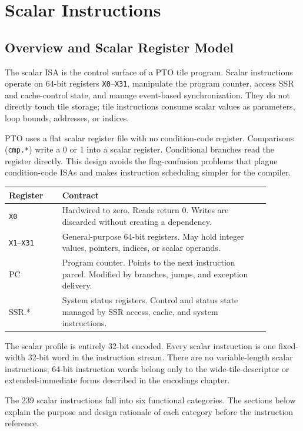 \chapter{Scalar Instructions}
\label{chap:scalar-instructions}

\section{Overview and Scalar Register Model}
The scalar ISA is the control surface of a PTO tile program. Scalar instructions operate on 64-bit registers \texttt{X0}--\texttt{X31}, manipulate the program counter, access SSR and cache-control state, and manage event-based synchronization. They do not directly touch tile storage; tile instructions consume scalar values as parameters, loop bounds, addresses, or indices.

PTO uses a flat scalar register file with no condition-code register. Comparisons (\texttt{cmp.*}) write a 0 or 1 into a scalar register. Conditional branches read the register directly. This design avoids the flag-confusion problems that plague condition-code ISAs and makes instruction scheduling simpler for the compiler.

\begin{longtable}{@{}L{0.18\linewidth}L{0.70\linewidth}@{}}
\toprule
Register & Contract \\
\midrule
\texttt{X0} & Hardwired to zero. Reads return 0. Writes are discarded without creating a dependency. \\
\texttt{X1}--\texttt{X31} & General-purpose 64-bit registers. May hold integer values, pointers, indices, or scalar operands. \\
PC & Program counter. Points to the next instruction parcel. Modified by branches, jumps, and exception delivery. \\
SSR.* & System status registers. Control and status state managed by SSR access, cache, and system instructions. \\
\bottomrule
\end{longtable}

The scalar profile is entirely 32-bit encoded. Every scalar instruction is one fixed-width 32-bit word in the instruction stream. There are no variable-length scalar instructions; 64-bit instruction words belong only to the wide-tile-descriptor or extended-immediate forms described in the encodings chapter.

The 239 scalar instructions fall into six functional categories. The sections below explain the purpose and design rationale of each category before the instruction reference.

